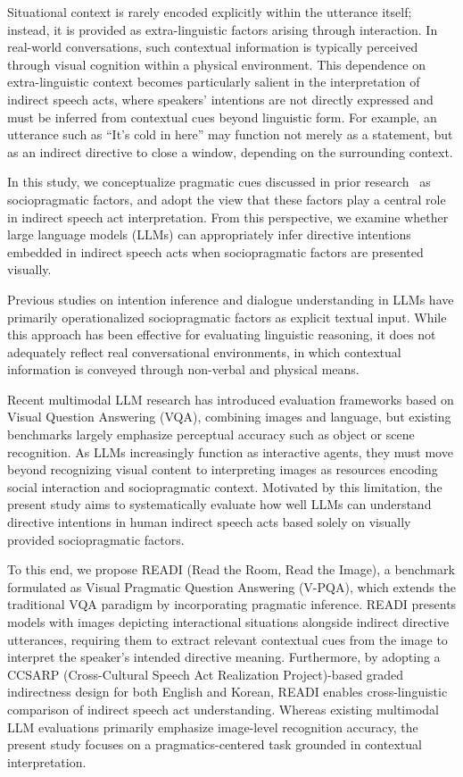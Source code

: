 \documentclass[11pt]{article}
\begin{document}
Situational context is rarely encoded explicitly within the utterance itself; instead, it is provided as extra-linguistic factors arising through interaction. In real-world conversations, such contextual information is typically perceived through visual cognition within a physical environment. This dependence on extra-linguistic context becomes particularly salient in the interpretation of indirect speech acts, where speakers’ intentions are not directly expressed and must be inferred from contextual cues beyond linguistic form. For example, an utterance such as “It’s cold in here” may function not merely as a statement, but as an indirect directive to close a window, depending on the surrounding context.

In this study, we conceptualize pragmatic cues discussed in prior research~\citep{searle1975indirect,leech19836principles,brown1987politeness,hymes1974foundations} as sociopragmatic factors, and adopt the view that these factors play a central role in indirect speech act interpretation. From this perspective, we examine whether large language models (LLMs) can appropriately infer directive intentions embedded in indirect speech acts when sociopragmatic factors are presented visually.

Previous studies on intention inference and dialogue understanding in LLMs have primarily operationalized sociopragmatic factors as explicit textual input. While this approach has been effective for evaluating linguistic reasoning, it does not adequately reflect real conversational environments, in which contextual information is conveyed through non-verbal and physical means.

Recent multimodal LLM research has introduced evaluation frameworks based on Visual Question Answering (VQA), combining images and language, but existing benchmarks largely emphasize perceptual accuracy such as object or scene recognition. As LLMs increasingly function as interactive agents, they must move beyond recognizing visual content to interpreting images as resources encoding social interaction and sociopragmatic context. Motivated by this limitation, the present study aims to systematically evaluate how well LLMs can understand directive intentions in human indirect speech acts based solely on visually provided sociopragmatic factors.

To this end, we propose READI (Read the Room, Read the Image), a benchmark formulated as Visual Pragmatic Question Answering (V-PQA), which extends the traditional VQA paradigm by incorporating pragmatic inference. READI presents models with images depicting interactional situations alongside indirect directive utterances, requiring them to extract relevant contextual cues from the image to interpret the speaker’s intended directive meaning. Furthermore, by adopting a CCSARP (Cross-Cultural Speech Act Realization Project)-based graded indirectness design for both English and Korean, READI enables cross-linguistic comparison of indirect speech act understanding. Whereas existing multimodal LLM evaluations primarily emphasize image-level recognition accuracy, the present study focuses on a pragmatics-centered task grounded in contextual interpretation.
\end{document}

